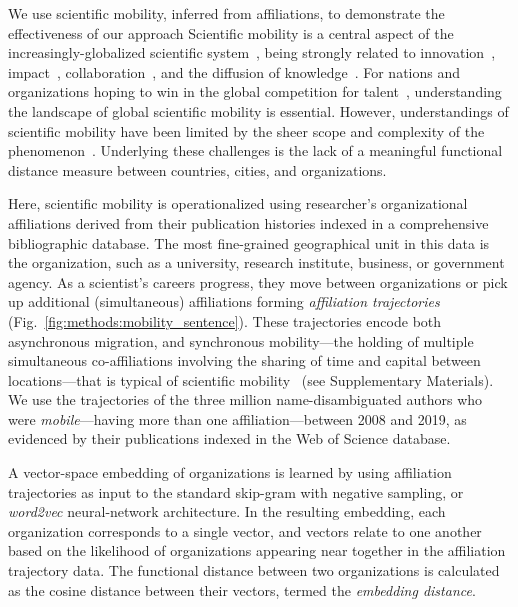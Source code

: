 \documentclass[12pt]{article} %
\begin{document}
We use scientific mobility, inferred from affiliations, to demonstrate the effectiveness of our approach
Scientific mobility is a central aspect of the increasingly-globalized scientific system~\autocite{czaika2018globalisation, altbach2004globalization}, being strongly related to innovation~\autocite{braunerhjelm2020labor, kaiser2018innovation, armano2017innovation}, impact~\autocite{sugimoto2017mostimpact, petersen2018multiscale, franzoni2014advantage}, collaboration~\autocite{rodrigues2016mobility}, and the diffusion of knowledge~\autocite{braunerhjelm2020labor, azoulay2011diffusion, morgan2018prestige}.
For nations and organizations hoping to win in the global competition for talent~\autocite{box2008competition}, understanding the landscape of global scientific mobility is essential. 
However, understandings of scientific mobility have been limited by the sheer scope and complexity of the phenomenon~\autocite{robinson2019mobility, vannoorden2012mobility, deville2014career, ackers2008mobility, scott2015dynamics}.
Underlying these challenges is the lack of a meaningful functional distance measure between countries, cities, and organizations. 

Here, scientific mobility is operationalized using researcher's organizational affiliations derived from their publication histories indexed in a comprehensive bibliographic database. 
The most fine-grained geographical unit in this data is the organization, such as a university, research institute, business, or government agency.
As a scientist's careers progress, they move between organizations or pick up additional (simultaneous) affiliations forming \textit{affiliation trajectories} (Fig.~\ref{fig:methods:mobility_sentence}).
These trajectories encode both asynchronous migration, and synchronous mobility---the holding of multiple simultaneous co-affiliations involving the sharing of time and capital between locations---that is typical of scientific mobility~\autocite{rodrigues2016mobility, markova2016synchronous, sugimoto2017mostimpact} (see Supplementary Materials).
We use the trajectories of the three million name-disambiguated authors who were \textit{mobile}---having more than one affiliation---between 2008 and 2019, as evidenced by their publications indexed in the Web of Science database.


A vector-space embedding of organizations is learned by using affiliation trajectories as input to the standard skip-gram with negative sampling, or \textit{word2vec} neural-network architecture.
In the resulting embedding, each organization corresponds to a single vector, and vectors relate to one another based on the likelihood of organizations appearing near together in the affiliation trajectory data. 
The functional distance between two organizations is calculated as the cosine distance between their vectors, termed the \textit{embedding distance}.
\end{document}
